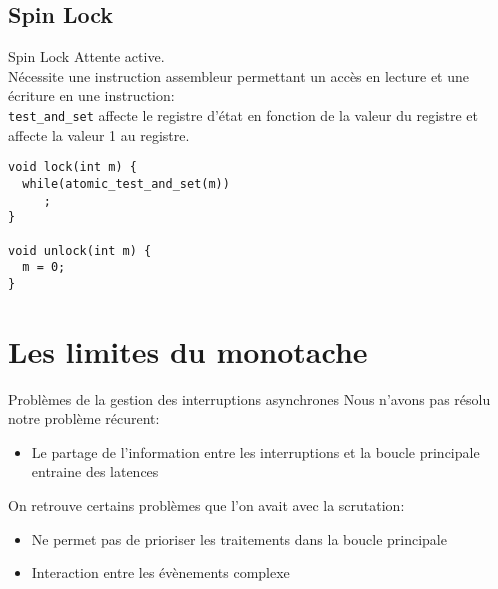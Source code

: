 \subsection{Spin Lock}

\begin{frame}[fragile]{Spin Lock}
  Attente active.\\
  Nécessite une instruction assembleur  permettant un accès en lecture
  et une écriture  en une instruction: \\
  \texttt{test\_and\_set} affecte le registre d'état en fonction de la
  valeur  du registre  et affecte  la valeur  1 au  registre.
  \begin{lstlisting} 
void lock(int m) {
  while(atomic_test_and_set(m))
     ;
}

void unlock(int m) {
  m = 0;
}
  \end{lstlisting} 
\end{frame}

\section{Les limites du monotache}

\begin{frame}{Problèmes de la gestion des interruptions asynchrones}
  Nous n'avons pas résolu notre problème récurent:
  \begin{itemize} 
  \item  Le partage  de l'information  entre les  interruptions  et la
    boucle principale entraine des latences
  \end{itemize} 
  On retrouve certains problèmes que l'on avait avec la scrutation:
  \begin{itemize} 
  \item  Ne permet  pas de  prioriser  les traitements  dans la  boucle
    principale
  \item Interaction entre les évènements complexe
  \end{itemize} 
\end{frame} 

